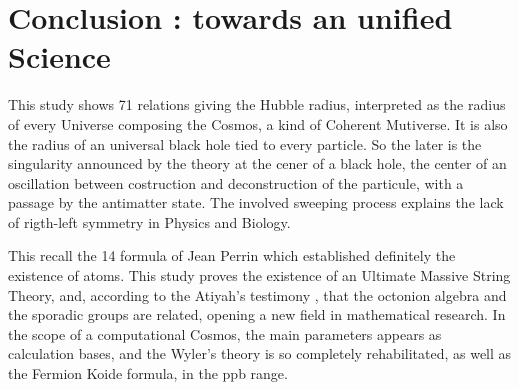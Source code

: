 \documentclass[a4paper,9pt]{article}
\begin{document}


    


\section{Conclusion : towards an unified Science}

This study shows 71 relations giving the Hubble radius, interpreted as the radius of every Universe composing the Cosmos, a kind of Coherent Mutiverse. It is also the radius of an universal black hole tied to every particle. So the later is the singularity announced by the theory at the cener of a black hole, the center of an oscillation between costruction and deconstruction of the particule, with a passage by the antimatter state. The involved sweeping process explains the lack of rigth-left symmetry  in Physics and Biology.


This recall the 14 formula of Jean Perrin which established definitely the existence of atoms. This study proves the existence of an Ultimate Massive String Theory, and, according to the Atiyah's testimony \cite{Atiyah}, that the octonion algebra and the sporadic groups are related, opening a new field in mathematical research. In the scope of a computational Cosmos, the main parameters appears as calculation bases, and the Wyler's theory is so completely rehabilitated, as well as the Fermion Koide formula, in the ppb range.  
\end{document}
